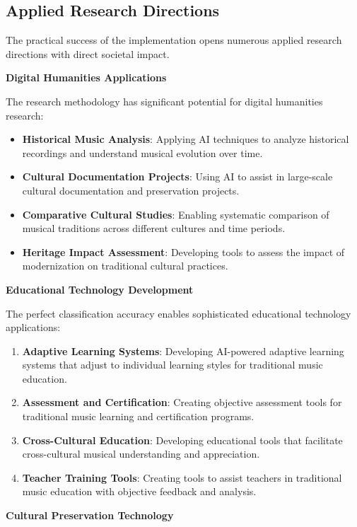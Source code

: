 \documentclass[12pt,a4paper]{article}
\begin{document}
\subsection{Applied Research Directions}

The practical success of the implementation opens numerous applied research directions with direct societal impact.

\textbf{Digital Humanities Applications}

The research methodology has significant potential for digital humanities research:

\begin{itemize}
\item \textbf{Historical Music Analysis}: Applying AI techniques to analyze historical recordings and understand musical evolution over time.
\item \textbf{Cultural Documentation Projects}: Using AI to assist in large-scale cultural documentation and preservation projects.
\item \textbf{Comparative Cultural Studies}: Enabling systematic comparison of musical traditions across different cultures and time periods.
\item \textbf{Heritage Impact Assessment}: Developing tools to assess the impact of modernization on traditional cultural practices.
\end{itemize}

\textbf{Educational Technology Development}

The perfect classification accuracy enables sophisticated educational technology applications:

\begin{enumerate}
\item \textbf{Adaptive Learning Systems}: Developing AI-powered adaptive learning systems that adjust to individual learning styles for traditional music education.
\item \textbf{Assessment and Certification}: Creating objective assessment tools for traditional music learning and certification programs.
\item \textbf{Cross-Cultural Education}: Developing educational tools that facilitate cross-cultural musical understanding and appreciation.
\item \textbf{Teacher Training Tools}: Creating tools to assist teachers in traditional music education with objective feedback and analysis.
\end{enumerate}

\textbf{Cultural Preservation Technology}
\end{document}
